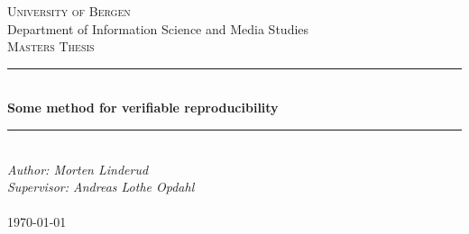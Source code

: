 \documentclass[../Main/thesis.tex]{subfiles}
\begin{document}

\newcommand{\HRule}{\rule{\linewidth}{0.5mm}}

\begin{titlepage}
\begin{center}
\textsc{\Huge University of Bergen}\\[0.4cm]

\large Department of Information Science and Media Studies\\[0.7cm]
\textsc{\huge Masters Thesis}\\[0.4cm]
\HRule \\[0.4cm]
{ \huge \bfseries Some method for verifiable reproducibility}\\[0.5cm]
\HRule \\[1.0cm]

\emph{Author: Morten Linderud}\\
\emph{Supervisor: Andreas Lothe Opdahl}\\

\paragraph*{}
\end{center}
\vfill
\begin{center}
{\large \today}
\end{center}
\end{titlepage}
\end{document}
